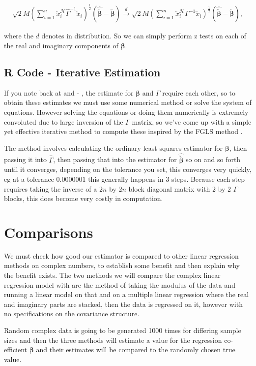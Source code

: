 \documentclass[honours,12pt]{unswthesis}
\newcommand{\ct}{\mathcal{H}}
\numberwithin{equation}{section}
\begin{document}
\begin{align*}
		\sqrt{2} M \left( \sum_{i = 1}^{n} \utilde{x}_{i}^{\ct} \widehat{\Gamma}^{-1} \utilde{x}_{i} \right)^{\frac{1}{2}} \left( \widehat{\utilde{\bm{\beta}}} - \utilde{\bm{\beta}} \right) \xrightarrow{d} \sqrt{2} M \left( \sum_{i = 1}^{n} \utilde{x}_{i}^{\ct} \Gamma^{-1} \utilde{x}_{i} \right)^{\frac{1}{2}} \left( \widehat{\utilde{\bm{\beta}}} - \utilde{\bm{\beta}} \right),
\end{align*}

\noindent where the $d$ denotes in distribution. So we can simply perform z tests on each of the real and imaginary components of $\bm{\beta}$.


\subsection{R Code - Iterative Estimation} \label{iterative}

If you note back at  and  - , the estimate for $\bm{\beta}$ and $\Gamma$ require each other, so to obtain these estimates we must use some numerical method or solve the system of equations. However solving the equations or doing them numerically is extremely convoluted due to large inversion of the $\Gamma$ matrix, so we've come up with a simple yet effective iterative method to compute these inspired by the FGLS method \cite{FGLSwiki}. \par
\noindent The method involves calculating the ordinary least squares estimator for $\bm{\beta}$, then passing it into $\widehat{\Gamma}$, then passing that into the estimator for $\widehat{\utilde{\bm{\beta}}}$ so on and so forth until it converges, depending on the tolerance you set, this converges very quickly, eg at a tolerance $0.0000001$ this generally happens in 3 steps. Because each step requires taking the inverse of a $2 n$ by $2 n$ block diagonal matrix with $2$ by $2$ $\Gamma$ blocks, this does become very costly in computation.


\section{Comparisons}

We must check how good our estimator is compared to other linear regression methods on complex numbers, to establish some benefit and then explain why the benefit exists. The two methods we will compare the complex linear regression model with are the method of taking the modulus of the data and running a linear model on that and on a multiple linear regression where the real and imaginary parts are stacked, then the data is regressed on it, however with no specifications on the covariance structure. \par
\noindent Random complex data is going to be generated 1000 times for differing sample sizes and then the three methods will estimate a value for the regression co-efficient $\bm{\beta}$ and their estimates will be compared to the randomly chosen true value.
\end{document}
